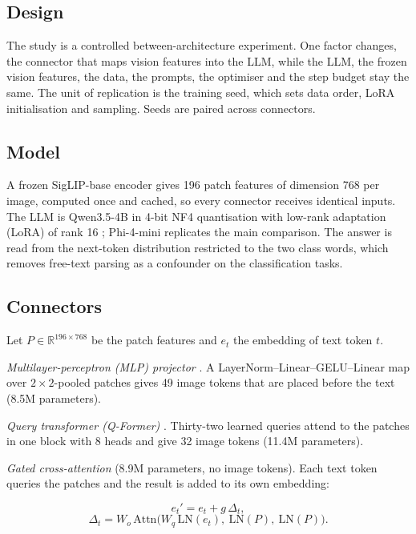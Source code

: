 \subsection{Design}

The study is a controlled between-architecture experiment. One factor changes, the connector that maps vision
features into the LLM, while the LLM, the frozen vision features, the data, the prompts, the optimiser and the
step budget stay the same. The unit of replication is the training seed, which sets data order, LoRA
initialisation and sampling. Seeds are paired across connectors.

\subsection{Model}

A frozen SigLIP-base encoder \citep{zhai2023siglip} gives 196 patch features of dimension 768 per image, computed once
and cached, so every connector receives identical inputs. The LLM is Qwen3.5-4B \citep{qwen2026qwen35} in 4-bit NF4 quantisation with
low-rank adaptation (LoRA) of rank 16 \citep{dettmers2023qlora,hu2022lora}; Phi-4-mini \citep{abouelenin2025phi4mini} replicates the main
comparison. The answer is read from the next-token distribution restricted to the two class words, which removes
free-text parsing as a confounder on the classification tasks.

\subsection{Connectors}

Let \(P \in \mathbb{R}^{196 \times 768}\) be the patch features and \(e_t\) the embedding of text token \(t\).

\emph{Multilayer-perceptron (MLP) projector} \citep{liu2024llava15}. A LayerNorm--Linear--GELU--Linear map over \(2 \times 2\)-pooled patches gives 49 image
tokens that are placed before the text (8.5M parameters).

\emph{Query transformer (Q-Former)} \citep{li2023blip2}. Thirty-two learned queries attend to the patches in one block with 8 heads and give 32
image tokens (11.4M parameters).

\emph{Gated cross-attention} (8.9M parameters, no image tokens). Each text token queries the patches and the result is
added to its own embedding:

\[
e_t' = e_t + g \, \Delta_t,
\]
\[
\Delta_t = W_o\,\mathrm{Attn}\big(W_q\,\mathrm{LN}(e_t),\ \mathrm{LN}(P),\ \mathrm{LN}(P)\big).
\]

